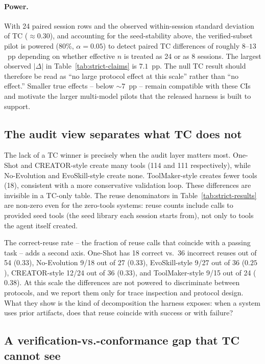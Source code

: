 \documentclass[sigconf,anonymous,review,natbib=false]{acmart}
\begin{document}
\paragraph{Power.} With 24 paired session rows and the observed within-session standard deviation of TC ($\approx 0.30$), and accounting for the seed-stability above, the verified-subset pilot is powered (80\%, $\alpha{=}0.05$) to detect paired TC differences of roughly $8$--$13$~pp depending on whether effective $n$ is treated as 24 or as 8 sessions. The largest observed $|\Delta|$ in Table~\ref{tab:strict-claims} is $7.1$~pp. The null TC result should therefore be read as ``no large protocol effect at this scale'' rather than ``no effect.'' Smaller true effects -- below $\sim 7$~pp -- remain compatible with these CIs and motivate the larger multi-model pilots that the released harness is built to support.

\subsection{The audit view separates what TC does not}

The lack of a TC winner is precisely when the audit layer matters most. One-Shot and CREATOR-style create many tools (114 and 111 respectively), while No-Evolution and EvoSkill-style create none. ToolMaker-style creates fewer tools (18), consistent with a more conservative validation loop. These differences are invisible in a TC-only table. The reuse denominators in Table~\ref{tab:strict-results} are non-zero even for the zero-tools systems: reuse counts include calls to provided seed tools (the seed library each session starts from), not only to tools the agent itself created.

The correct-reuse rate -- the fraction of reuse calls that coincide with a passing task -- adds a second axis. One-Shot has 18 correct vs.\ 36 incorrect reuses out of 54 ($0.33$), No-Evolution 9/18 out of 27 ($0.33$), EvoSkill-style 9/27 out of 36 ($0.25$), CREATOR-style 12/24 out of 36 ($0.33$), and ToolMaker-style 9/15 out of 24 ($0.38$). At this scale the differences are not powered to discriminate between protocols, and we report them only for trace inspection and protocol design. What they show is the kind of decomposition the harness exposes: when a system uses prior artifacts, does that reuse coincide with success or with failure?

\subsection{A verification-vs.-conformance gap that TC cannot see}
\label{sec:gap}
\end{document}
